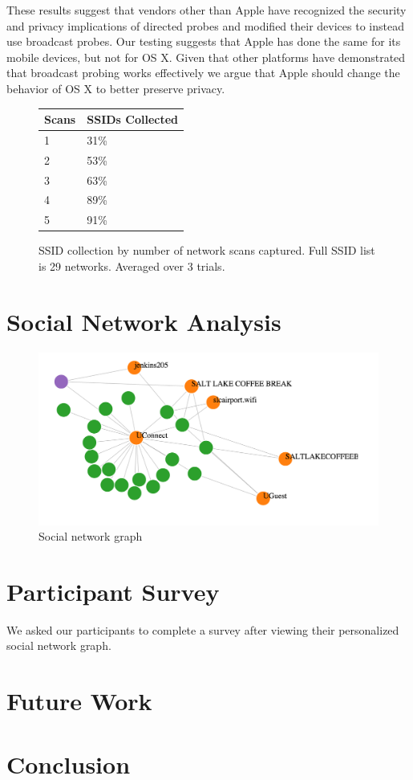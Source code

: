 \documentclass[letterpaper,twocolumn,10pt]{article}
\begin{document}
These results suggest that vendors other than Apple have recognized the security and privacy implications of directed probes and modified their devices to instead use broadcast probes. Our testing suggests that Apple has done the same for its mobile devices, but not for OS X. Given that other platforms have demonstrated that broadcast probing works effectively we argue that Apple should change the behavior of OS X to better preserve privacy.



\begin{figure}
\centering
\begin{tabular}{l | l}
Scans & SSIDs Collected \\ 
\hline
1 & 31\% \\
2 & 53\% \\
3 & 63\% \\
4 & 89\% \\
5 & 91\% \\
\end{tabular}
\caption{SSID collection by number of network scans captured. Full SSID list is 29 networks. Averaged over 3 trials.}
\label{scans}
\end{figure}

\section{Social Network Analysis}
\label{social}
\begin{figure}
\centering
\includegraphics[scale=.5]{graph.png}
\caption{\textsf{Social network graph}}
\end{figure}

\section{Participant Survey}
We asked our participants to complete a survey after viewing their personalized social network graph.


\section{Future Work}

\section{Conclusion}
\end{document}
